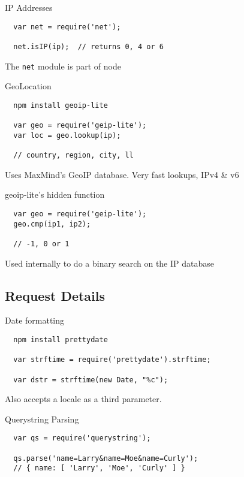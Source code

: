 \documentclass{beamer}
\begin{document}
\begin{frame}[fragile]{IP Addresses}
\begin{verbatim}
  var net = require('net');

  net.isIP(ip);  // returns 0, 4 or 6
\end{verbatim}
The \texttt{net} module is part of node
\end{frame}

\begin{frame}[fragile]{GeoLocation}
\begin{verbatim}
  npm install geoip-lite

  var geo = require('geip-lite');
  var loc = geo.lookup(ip);

  // country, region, city, ll
\end{verbatim}
Uses MaxMind's GeoIP database.  Very fast lookups, IPv4 \& v6
\end{frame}

\begin{frame}[fragile]{geoip-lite's hidden function}
\begin{verbatim}
  var geo = require('geip-lite');
  geo.cmp(ip1, ip2);

  // -1, 0 or 1
\end{verbatim}
Used internally to do a binary search on the IP database
\end{frame}

\subsection{Request Details}
\begin{frame}[fragile]{Date formatting}
\begin{verbatim}
  npm install prettydate

  var strftime = require('prettydate').strftime;

  var dstr = strftime(new Date, "%c");
\end{verbatim}
Also accepts a locale as a third parameter.
\end{frame}

\begin{frame}[fragile]{Querystring Parsing}
\begin{verbatim}
  var qs = require('querystring');

  qs.parse('name=Larry&name=Moe&name=Curly');
  // { name: [ 'Larry', 'Moe', 'Curly' ] }
\end{verbatim}
\end{frame}
\end{document}
